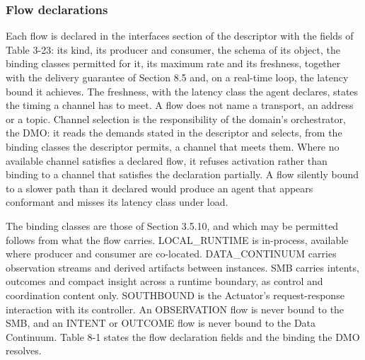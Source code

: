 \hypertarget{flow-declarations}{%
\subsubsection{Flow declarations}\label{flow-declarations}}

Each flow is declared in the interfaces section of the descriptor with
the fields of Table 3-23: its kind, its producer and consumer, the
schema of its object, the binding classes permitted for it, its maximum
rate and its freshness, together with the delivery guarantee of Section
8.5 and, on a real-time loop, the latency bound it achieves. The
freshness, with the latency class the agent declares, states the timing
a channel has to meet. A flow does not name a transport, an address or a
topic. Channel selection is the responsibility of the domain's
orchestrator, the DMO: it reads the demands stated in the descriptor and
selects, from the binding classes the descriptor permits, a channel that
meets them. Where no available channel satisfies a declared flow, it
refuses activation rather than binding to a channel that satisfies the
declaration partially. A flow silently bound to a slower path than it
declared would produce an agent that appears conformant and misses its
latency class under load.

The binding classes are those of Section 3.5.10, and which may be
permitted follows from what the flow carries.
LOCAL\_\allowbreak{}RUNTIME is in-process, available where producer and
consumer are co-located. DATA\_\allowbreak{}CONTINUUM carries
observation streams and derived artifacts between instances. SMB carries
intents, outcomes and compact insight across a runtime boundary, as
control and coordination content only. SOUTHBOUND is the Actuator's
request-response interaction with its controller. An OBSERVATION flow is
never bound to the SMB, and an INTENT or OUTCOME flow is never bound to
the Data Continuum. Table 8-1 states the flow declaration fields and the
binding the DMO resolves.

